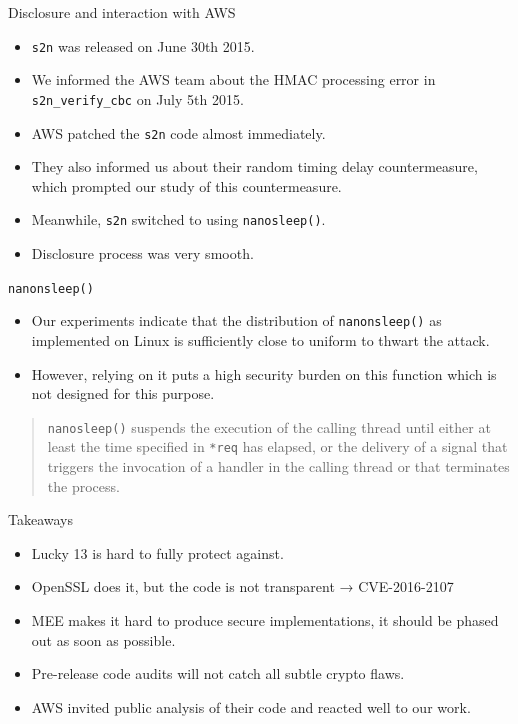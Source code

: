 \documentclass[presentation,smaller]{beamer}
\begin{document}
\begin{frame}[fragile,label={sec:orgheadline27}]{Disclosure and interaction with AWS}
 \begin{itemize}
\item \texttt{s2n} was released on June 30th 2015.
\item We informed the AWS team about the HMAC processing error in \texttt{s2n\_verify\_cbc} on July 5th 2015.
\item AWS patched the \texttt{s2n} code almost immediately.
\item They also informed us about their random timing delay countermeasure, which prompted our study of this countermeasure.
\item Meanwhile, \texttt{s2n} switched to using \texttt{nanosleep()}.
\item Disclosure process was very smooth.
\end{itemize}
\end{frame}

\begin{frame}[fragile,label={sec:orgheadline28}]{\texttt{nanonsleep()}}
 \begin{itemize}
\item Our experiments indicate that the distribution of \texttt{nanonsleep()} as implemented on Linux is sufficiently close to uniform to thwart the attack.
\item However, relying on it puts a high security burden on this function which is not designed for this purpose.
\end{itemize}

\begin{quote}
\texttt{nanosleep()} suspends the execution of the calling thread until either \alert{at least} the time specified in \texttt{*req} has elapsed, or the delivery of a signal that triggers the invocation of a handler in the calling thread or that terminates the process.
\end{quote}
\end{frame}

\begin{frame}[label={sec:orgheadline29}]{Takeaways}
\begin{itemize}
\item Lucky 13 is hard to fully protect against.
\item OpenSSL does it, but the code is not transparent → CVE-2016-2107
\item MEE makes it hard to produce secure implementations, it should be phased out as soon as possible.
\item Pre-release code audits will not catch all subtle crypto flaws.
\item AWS invited public analysis of their code and reacted well to our work.
\end{itemize}
\end{frame}
\end{document}

